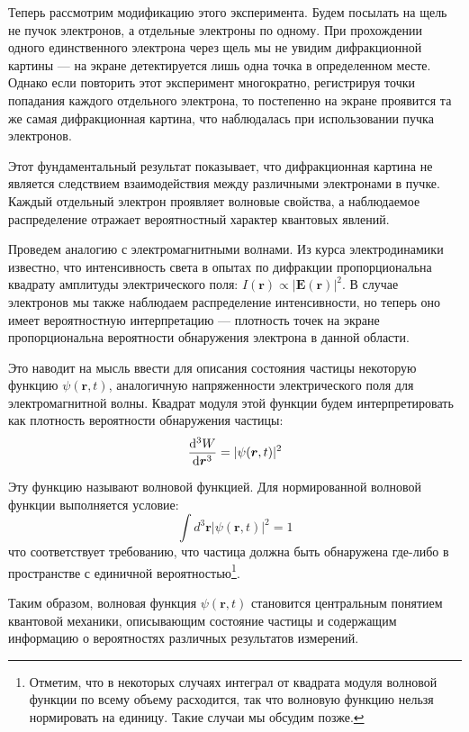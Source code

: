 \documentclass[a4paper, 12pt]{article}
\begin{document}
Теперь рассмотрим модификацию этого эксперимента. Будем посылать на щель не
пучок электронов, а отдельные электроны по одному. При прохождении одного
единственного электрона через щель мы не увидим дифракционной картины --- на
экране детектируется лишь одна точка в определенном месте. Однако если повторить
этот эксперимент многократно, регистрируя точки попадания каждого отдельного
электрона, то постепенно на экране проявится та же самая дифракционная картина,
что наблюдалась при использовании пучка электронов.

Этот фундаментальный результат показывает, что дифракционная картина не является
следствием взаимодействия между различными электронами в пучке. Каждый отдельный
электрон проявляет волновые свойства, а наблюдаемое распределение отражает
вероятностный характер квантовых явлений.

Проведем аналогию с электромагнитными волнами. Из курса электродинамики
известно, что интенсивность света в опытах по дифракции пропорциональна квадрату
амплитуды электрического поля: $I(\bm{r}) \propto |\bm{E}(\bm{r})|^2$. В случае электронов мы
также наблюдаем распределение интенсивности, но теперь оно имеет вероятностную
интерпретацию --- плотность точек на экране пропорциональна вероятности
обнаружения электрона в данной области.

Это наводит на мысль ввести для описания состояния частицы некоторую функцию
$\psi(\bm{r}, t)$, аналогичную напряженности электрического поля для электромагнитной
волны. Квадрат модуля этой функции будем интерпретировать как плотность
вероятности обнаружения частицы:
\begin{equation}
  \dv[3]{W}{\bm{r}} = |\psi(\bm{r}, t)|^2
\end{equation}

Эту функцию называют волновой функцией. Для нормированной волновой функции выполняется условие:
\begin{equation}
  \int d^3\bm{r} |\psi(\bm{r}, t)|^2  = 1
\end{equation}
что соответствует требованию, что частица должна быть обнаружена где-либо в
пространстве с единичной вероятностью\footnote{Отметим, что в некоторых случаях интеграл
  от квадрата модуля волновой функции по всему объему расходится, так что
  волновую функцию нельзя нормировать на единицу. Такие случаи мы обсудим
  позже.}.

Таким образом, волновая функция $\psi(\bm{r}, t)$ становится центральным понятием
квантовой механики, описывающим состояние частицы и содержащим информацию о
вероятностях различных результатов измерений.
\end{document}
